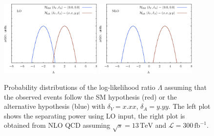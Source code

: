 \documentclass[preprint]{JHEP3} %
\newcommand{\TeV}{\mathrm{TeV}}
\def\invfb {\mathrm{fb}^{-1}}
\begin{document}
\begin{figure}[t]
\centering %
\includegraphics[width=0.45\textwidth]{./LogLikelihoods_LO.eps}
\hfill
\includegraphics[width=0.45\textwidth]{./LogLikelihoods_NLO.eps}\caption{\label{fig:iv}
Probability distributions of the log-likelihood ratio $\Lambda$ assuming that the observed events follow the SM hypothesis (red) or the alternative hypothesis (blue) 
with $\delta_V=x.xx$, $\delta_A=y.yy$. The left plot shows the separating power using LO input, the right plot is obtained from NLO QCD assuming $\sqrt{s}=13\,\TeV$ and $\mathcal{L}=300\,\invfb$.
}
\end{figure}
\end{document}
